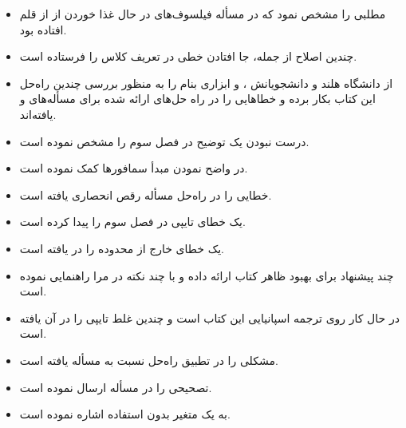 \documentclass{book}
\begin{document}
\begin{itemize}
\item {} 
    مطلبی را مشخص نمود که در مسأله فیلسوف‌های در حال غذا خوردن از از قلم افتاده بود. 
    

\item {}
    چندین اصلاح از جمله، جا افتادن خطی در تعریف کلاس  را فرستاده است. 

\item {}
    از دانشگاه  هلند و دانشجویانش 
    ،  و 
    ابزاری بنام  را به منظور بررسی چندین راه‌حل این کتاب بکار برده و خطاهایی را در راه حل‌های ارائه شده برای 
    مسأله‌های  و   یافته‌اند. 
    
\item {}
    درست نبودن یک توضیح در فصل سوم را مشخص نموده است. 


\item  {} 
    در واضح نمودن مبدأ سمافورها کمک نموده است. 

\item {} 
    خطایی را در راه‌حل مسأله رقص انحصاری یافته است. 

\item {} یک خطای تایپی در فصل سوم را پیدا کرده است. 

\item {} 
    یک خطای خارج از محدوده را در  یافته است. 

\item {}
    چند پیشنهاد برای بهبود ظاهر کتاب ارائه داده و با چند نکته در \lr{\LaTeX} مرا راهنمایی نموده است. 
    
\item   {} 
    در حال کار روی ترجمه اسپانیایی این کتاب است و چندین غلط تایپی را در آن یافته است. 

\item {} 
    مشکلی را در تطبیق راه‌حل  نسبت به مسأله  یافته است. 

\item {}
    تصحیحی را در مسأله   ارسال نموده است. 
    
\item {}
    به یک متغیر بدون استفاده اشاره نموده است. 


\end{itemize}
\end{document}
